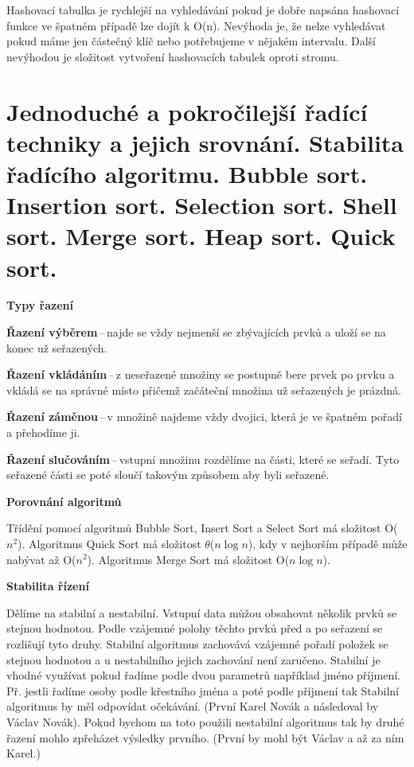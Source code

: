 Hashovací tabulka je rychlejší na vyhledávání pokud je dobře napsána hashovací funkce ve špatném případě lze dojít k O(n). Nevýhoda je, že nelze vyhledávat pokud máme jen částečný klíč nebo potřebujeme v nějakém intervalu. Další nevýhodou je složitost vytvoření hashovacích tabulek oproti stromu.










\clearpage
\section{Jednoduché a pokročilejší řadící techniky a jejich srovnání. Stabilita řadícího algoritmu. Bubble sort. Insertion sort. Selection sort. Shell sort. Merge sort. Heap sort. Quick sort.}

\begin{Large}\vspace{0,5cm} \textbf{Typy řazení}
\end{Large}

\textbf{Řazení výběrem}\,--\,najde se vždy nejmenší se zbývajících prvků a uloží se na konec už seřazených.

\textbf{Řazení vkládáním}\,--\,z neseřazené množiny se postupně bere prvek po prvku a vkládá se na správné místo přičemž začáteční množina už seřazených je prázdná.

\textbf{Řazení záměnou}\,--\,v množině najdeme vždy dvojici, která je ve špatném pořadí a přehodíme ji.

\textbf{Řazení slučováním}\,--\,vstupní množinu rozdělíme na části, které se seřadí. Tyto seřazené části se poté sloučí takovým způsobem aby byli seřazené.

\begin{Large}\vspace{0,5cm} \textbf{Porovnání algoritmů}
\end{Large}

Třídění pomocí algoritmů Bubble Sort, Insert Sort a Select Sort má složitost O($n^2$). Algoritmus Quick Sort má složitost $\theta$($n\log{n}$), kdy v nejhorším případě může nabývat až O($n^2$). Algoritmus Merge Sort má složitost O($n\log{n}$).

\begin{Large}\vspace{0,5cm} \textbf{Stabilita řízení}
\end{Large}

Dělíme na stabilní a nestabilní. Vstupní data můžou obsahovat několik prvků se stejnou hodnotou. Podle vzájemné polohy těchto prvků před a po seřazení se rozlišují tyto druhy. Stabilní algoritmus zachovává vzájemné pořadí položek se stejnou hodnotou a u nestabilního jejich zachování není zaručeno. Stabilní je vhodné využívat pokud řadíme podle dvou parametrů například jméno příjmení. Př. jestli řadíme osoby podle křestního jména a poté podle příjmení tak Stabilní algoritmus by měl odpovídat očekávání. (První Karel Novák a následoval by Václav Novák). Pokud bychom na toto použili nestabilní algoritmus tak by druhé řazení mohlo zpřeházet výsledky prvního. (První by mohl být Václav a až za ním Karel.)


